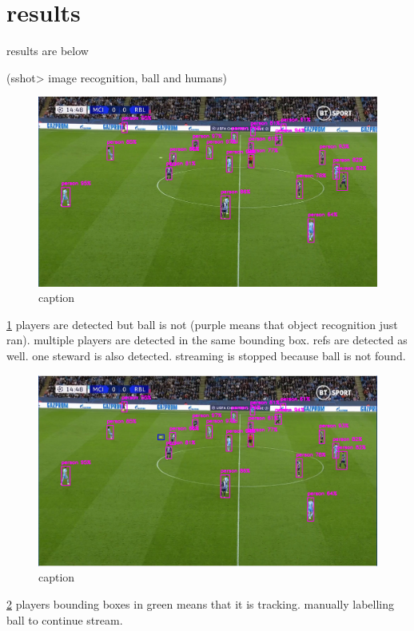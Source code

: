 \documentclass[
11pt,
twoside
]{report}
\begin{document}
\section{results}

results are below


\listoffigures

(sshot\textgreater{} image recognition, ball and humans)

\begin{figure}[H]
    \includegraphics[keepaspectratio, width=\columnwidth]{first.png}
    \caption{caption}
    \label{img:1}
\end{figure}
\ref{img:1}
players are detected but ball is not (purple means that object recognition just ran). multiple players are detected in the same bounding box. refs are detected as well. one steward is also detected. streaming is stopped because ball is not found.
\begin{figure}[H]
    \includegraphics[keepaspectratio, width=\columnwidth]{Screenshot_2022-03-03_21-32-51.png}
    \caption{caption}
    \label{img:2}
\end{figure}
\ref{img:2} players bounding boxes in green means that it is tracking. manually labelling ball to continue stream.
\end{document}
